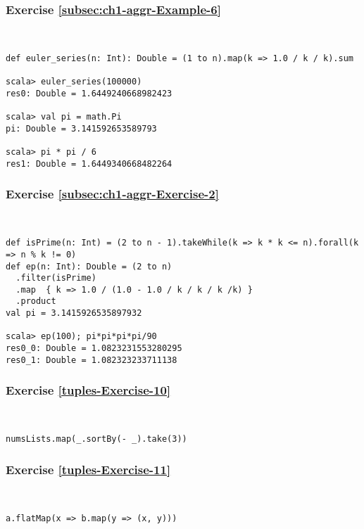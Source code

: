 \subsubsection*{Exercise \ref{subsec:ch1-aggr-Example-6}}

~

\begin{lstlisting}
def euler_series(n: Int): Double = (1 to n).map(k => 1.0 / k / k).sum

scala> euler_series(100000)
res0: Double = 1.6449240668982423

scala> val pi = math.Pi
pi: Double = 3.141592653589793

scala> pi * pi / 6
res1: Double = 1.6449340668482264 
\end{lstlisting}


\subsubsection*{Exercise \ref{subsec:ch1-aggr-Exercise-2}}

~
\begin{lstlisting}
def isPrime(n: Int) = (2 to n - 1).takeWhile(k => k * k <= n).forall(k => n % k != 0)
def ep(n: Int): Double = (2 to n)
  .filter(isPrime)
  .map  { k => 1.0 / (1.0 - 1.0 / k / k / k /k) }
  .product
val pi = 3.1415926535897932

scala> ep(100); pi*pi*pi*pi/90
res0_0: Double = 1.0823231553280295
res0_1: Double = 1.082323233711138 
\end{lstlisting}



\subsubsection*{Exercise \ref{tuples-Exercise-10}}

~
\begin{lstlisting}
numsLists.map(_.sortBy(- _).take(3))
\end{lstlisting}


\subsubsection*{Exercise \ref{tuples-Exercise-11}}

~
\begin{lstlisting}
a.flatMap(x => b.map(y => (x, y)))
\end{lstlisting}


